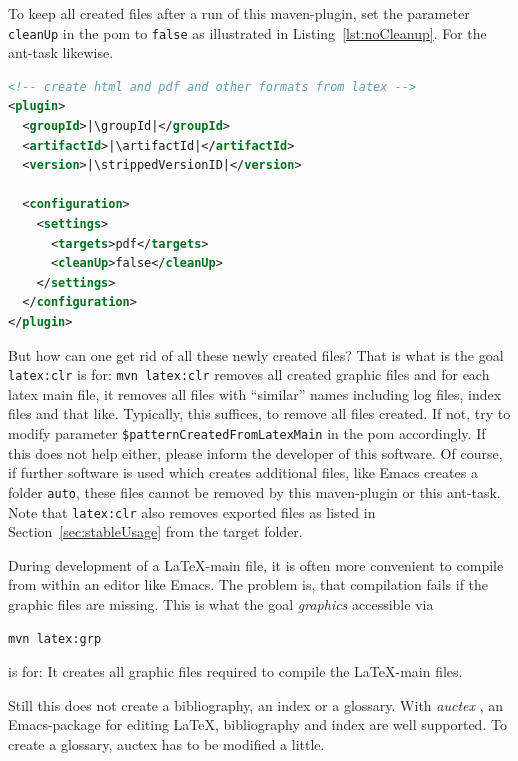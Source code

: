 \documentclass[12pt]{book}
\renewcommand{\index}[1]{ }
\begin{document}
To keep all created files after a run of this maven-plugin, 
set the parameter \texttt{cleanUp} in the pom 
to \texttt{false} as illustrated in Listing~\ref{lst:noCleanup}. 
For the ant-task likewise. 

\begin{lstlisting}[language=xml, basicstyle=\small,
escapechar=|,
float=b, captionpos=b, label={lst:noCleanup},
caption={Configuration without cleanup}]
<!-- create html and pdf and other formats from latex -->
<plugin>
  <groupId>|\groupId|</groupId>
  <artifactId>|\artifactId|</artifactId>
  <version>|\strippedVersionID|</version>
	
  <configuration>
    <settings>
      <targets>pdf</targets>
      <cleanUp>false</cleanUp>
    </settings>
  </configuration>
</plugin>
\end{lstlisting}


But how can one get rid of all these newly created files? 
That is what is the goal \texttt{latex:clr} is for: 
% 
\texttt{mvn latex:clr}
%
removes all created graphic files 
and for each latex main file, it removes all files with ``similar'' names
including log files, index files and that like.
Typically, this suffices, to remove all files created. 
If not, 
try to modify parameter \texttt{\$patternCreatedFromLatexMain} 
in the pom accordingly. 
If this does not help either, please inform the developer of this software. 
Of course, if further software is used which creates additional files, 
like Emacs creates a folder \texttt{auto}, 
these files cannot be removed by this maven-plugin or this ant-task.
Note that \texttt{latex:clr}
also removes exported files as listed in Section~\ref{sec:stableUsage}
from the target folder. 

During development of a \LaTeX-main file, 
it is often more convenient to compile from within an editor like Emacs. 
The problem is, that compilation fails if the graphic files are missing. 
This is what the goal {\em graphics\/} accessible via 
% 
\begin{Verbatim}
mvn latex:grp
\end{Verbatim}
%
is for: 
It creates all graphic files required to compile the \LaTeX-main files. 

Still this does not create a bibliography, an index or a glossary. 
With {\em auctex\/}\index{auctex}, an Emacs-package for editing \LaTeX, 
bibliography and index are well supported. 
To create a glossary, auctex has to be modified a little. 
\end{document}
